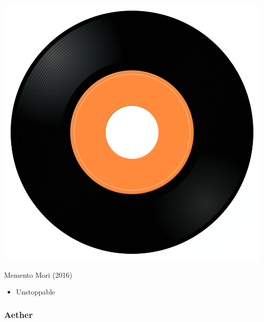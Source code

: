 \begin{minipage}[t]{0.25\textwidth}\vspace{0pt}
\captionsetup{type=figure}
\includegraphics[width=\textwidth]{Images/cover.png}
\caption*{Memento Mori (2016)}
\end{minipage}
\begin{minipage}[t]{0.25\textwidth}\vspace{0pt}
\begin{itemize}[nosep,leftmargin=1em,labelwidth=*,align=left]
	\setlength{\itemsep}{0pt}
	\item Unstoppable
\end{itemize}
\end{minipage}

\subsubsection{Aether}


